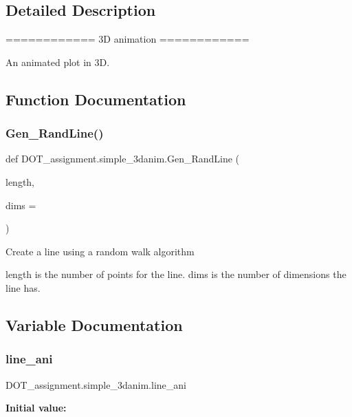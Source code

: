 \subsection{Detailed Description}
\begin{DoxyVerb}============
3D animation
============

An animated plot in 3D.
\end{DoxyVerb}
 

\subsection{Function Documentation}
\mbox{\label{namespace_d_o_t__assignment_1_1simple__3danim_a2d1d08581cfa014bb8a90131d4510545}} 
\subsubsection{\texorpdfstring{Gen\_RandLine()}{Gen\_RandLine()}}
{\footnotesize\ttfamily def D\+O\+T\+\_\+assignment.\+simple\+\_\+3danim.\+Gen\+\_\+\+Rand\+Line (\begin{DoxyParamCaption}\item[{}]{length,  }\item[{}]{dims = {} }\end{DoxyParamCaption})}

\begin{DoxyVerb}Create a line using a random walk algorithm

length is the number of points for the line.
dims is the number of dimensions the line has.
\end{DoxyVerb}
 

\subsection{Variable Documentation}
\mbox{\label{namespace_d_o_t__assignment_1_1simple__3danim_a7028bc1636c725008f8f643bfa731941}} 
\subsubsection{\texorpdfstring{line\_ani}{line\_ani}}
{\footnotesize\ttfamily D\+O\+T\+\_\+assignment.\+simple\+\_\+3danim.\+line\+\_\+ani}

{\bfseries Initial value\+:}
\begin{DoxyCode}{0}

\end{DoxyCode}

